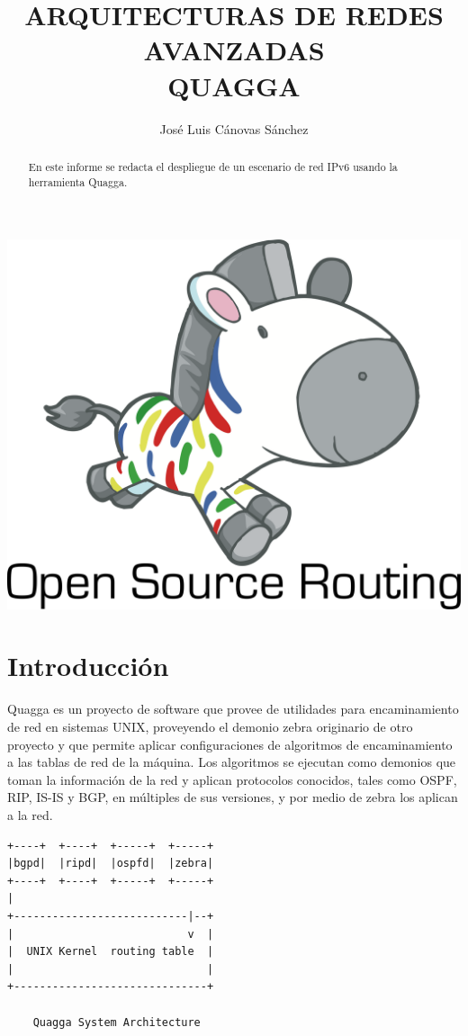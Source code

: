 \documentclass{article}
\author{José Luis Cánovas Sánchez}
\title{ARQUITECTURAS DE REDES AVANZADAS\\QUAGGA}
\begin{document}
\maketitle

\begin{center}
	\includegraphics[scale=0.3]{images/mascota.png}
\end{center}

\begin{abstract}
	En este informe se redacta el despliegue de un escenario de red IPv6 usando la herramienta Quagga.
\end{abstract}

\tableofcontents

\section{Introducción}

Quagga es un proyecto de software que provee de utilidades para encaminamiento de red en sistemas UNIX, proveyendo el demonio zebra originario de otro proyecto y que permite aplicar configuraciones de algoritmos de encaminamiento a las tablas de red de la máquina. Los algoritmos se ejecutan como demonios que toman la información de la red y aplican protocolos conocidos, tales como OSPF, RIP, IS-IS y BGP, en múltiples de sus versiones, y por medio de zebra los aplican a la red.

\begin{center}
	\begin{BVerbatim}
+----+  +----+  +-----+  +-----+
|bgpd|  |ripd|  |ospfd|  |zebra|
+----+  +----+  +-----+  +-----+
|
+---------------------------|--+
|                           v  |
|  UNIX Kernel  routing table  |
|                              |
+------------------------------+

    Quagga System Architecture
	\end{BVerbatim}
\end{center}
\end{document}
